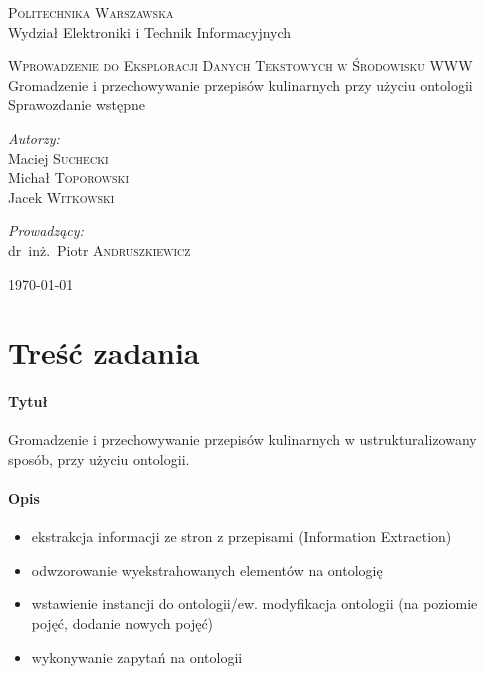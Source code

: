 \documentclass[11pt,a4paper]{article}
\begin{document}
\begin{titlepage}
  \begin{center}

    \textsc{\Large Politechnika Warszawska}\\[0.1cm]
    \small Wydział Elektroniki i Technik Informacyjnych
    \vfill

    \textsc{\small Wprowadzenie do Eksploracji Danych Tekstowych w Środowisku WWW }\\[0.1cm]
    \Huge Gromadzenie i przechowywanie przepisów kulinarnych przy użyciu ontologii\\[1.5cm]
    \small Sprawozdanie wstępne\\[2.5cm]

    \vfill

    \begin{minipage}{0.4\textwidth}
      \begin{flushleft} \large
        \emph{Autorzy:}\\[0.1cm]
        Maciej \textsc{Suchecki}\\
        Michał \textsc{Toporowski}\\
        Jacek \textsc{Witkowski}\\
      \end{flushleft}
    \end{minipage}
    \begin{minipage}{0.4\textwidth}
      \begin{flushright} \large
        \emph{Prowadzący:}\\[0.1cm]
        dr~inż.~Piotr \textsc{Andruszkiewicz}\\[1cm]
      \end{flushright}
    \end{minipage}

    \vfill
    {\large \today}

  \end{center}
\end{titlepage}

\section{Treść zadania}
\paragraph{Tytuł} Gromadzenie i przechowywanie przepisów kulinarnych w ustrukturalizowany sposób, przy użyciu ontologii.
\paragraph{Opis}
\begin{itemize}
  \item ekstrakcja informacji ze stron z przepisami (Information Extraction)
  \item odwzorowanie wyekstrahowanych elementów na ontologię
  \item wstawienie instancji do ontologii/ew. modyfikacja ontologii (na poziomie pojęć, dodanie nowych pojęć)
  \item wykonywanie zapytań na ontologii
\end{itemize}
\end{document}

